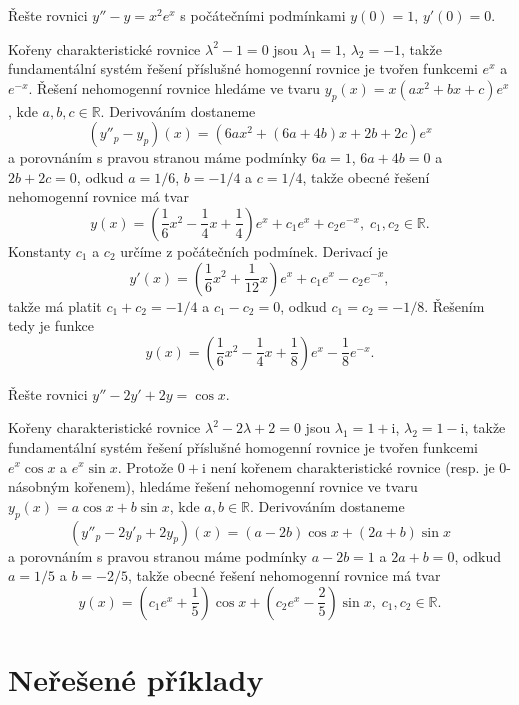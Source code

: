 \begin{ex}
   Řešte rovnici $y''-y=x^2e^x$ s počátečními podmínkami $y(0)=1$, $y'(0)=0$.
\end{ex}
\begin{sol}
   Kořeny charakteristické rovnice $\lambda^2-1=0$ jsou $\lambda_1=1$, $\lambda_2=-1$,
   takže fundamentální systém řešení příslušné homogenní rovnice je tvořen funkcemi $e^x$ a $e^{-x}$.
   Řešení nehomogenní rovnice hledáme ve tvaru $y_p(x)=x(ax^2+bx+c)e^x$, kde $a,b,c\in\mathbb{R}$.
   Derivováním dostaneme
   \[
      (y''_p-y_p)(x) = (6ax^2+(6a+4b)x+2b+2c)e^x
   \]
   a porovnáním s pravou stranou máme podmínky $6a=1$, $6a+4b=0$ a $2b+2c=0$, odkud
   $a=1/6$, $b=-1/4$ a $c=1/4$, takže obecné řešení nehomogenní rovnice má tvar
   \[
      y(x) = \left(\frac{1}{6}x^2-\frac{1}{4}x+\frac{1}{4}\right)e^x+c_1e^x+c_2e^{-x}, \; c_1,c_2\in\mathbb{R}.
   \]
   Konstanty $c_1$ a $c_2$ určíme z počátečních podmínek.
   Derivací je
   \[
      y'(x) = \left(\frac{1}{6}x^2+\frac{1}{12}x\right)e^x+c_1e^x-c_2e^{-x},
   \]
   takže má platit $c_1+c_2=-1/4$ a $c_1-c_2=0$, odkud $c_1=c_2=-1/8$.
   Řešením tedy je funkce
   \[
      y(x) = \left(\frac{1}{6}x^2-\frac{1}{4}x+\frac{1}{8}\right)e^x-\frac{1}{8}e^{-x}.
   \]
\end{sol}

\begin{ex}
   Řešte rovnici $y''-2y'+2y=\cos x$.%
\end{ex}
\begin{sol}
   Kořeny charakteristické rovnice $\lambda^2-2\lambda+2=0$ jsou $\lambda_1=1+\mathrm{i}$, $\lambda_2=1-\mathrm{i}$,
   takže fundamentální systém řešení příslušné homogenní rovnice je tvořen funkcemi 
   $e^x\cos x$ a $e^x\sin x$.
   Protože $0+\mathrm{i}$ není kořenem charakteristické rovnice (resp. je $0$-násobným kořenem),
   hledáme řešení nehomogenní rovnice ve tvaru $y_p(x)=a\cos x+b\sin x$, kde $a,b\in\mathbb{R}$.
   Derivováním dostaneme
   \[
      (y''_p-2y'_p+2y_p)(x) = (a-2b)\cos x+(2a+b)\sin x
   \]
   a porovnáním s pravou stranou máme podmínky $a-2b=1$ a $2a+b=0$, odkud
   $a=1/5$ a $b=-2/5$, takže obecné řešení nehomogenní rovnice má tvar
   \[
      y(x) = \left(c_1e^x+\frac{1}{5}\right)\cos x+\left(c_2e^x-\frac{2}{5}\right)\sin x, \; c_1,c_2\in\mathbb{R}.
   \]
\end{sol}

\section*{Neřešené příklady}

